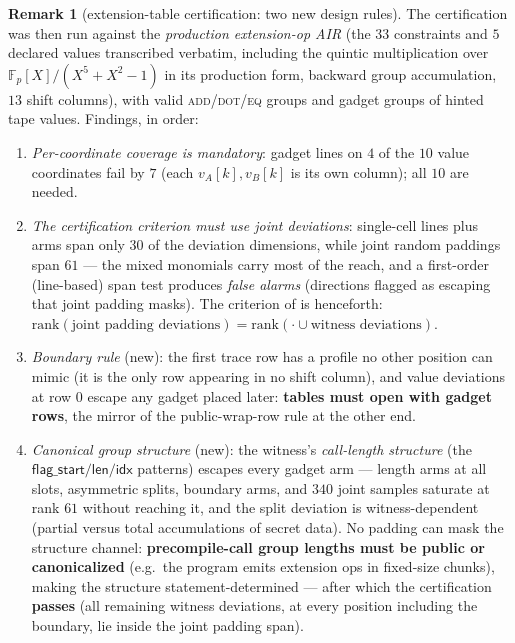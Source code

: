 \documentclass{article}
\newcommand{\Fp}{\mathbb{F}_p}
\theoremstyle{definition}
\newtheorem{remark}[theorem]{Remark}
\begin{document}
\begin{remark}[extension-table certification: two new design rules]\label{rem:numL}
The certification was then run against the \emph{production extension-op AIR} (the $33$ constraints and $5$ declared values transcribed verbatim, including the quintic multiplication over $\Fp[X]/(X^5{+}X^2{-}1)$ in its production form, backward group accumulation, $13$ shift columns), with valid \textsc{add}/\textsc{dot}/\textsc{eq} groups and gadget groups of hinted tape values. Findings, in order:
\begin{enumerate}
    \item \emph{Per-coordinate coverage is mandatory}: gadget lines on $4$ of the $10$ value coordinates fail by $7$ (each $v_A[k], v_B[k]$ is its own column); all $10$ are needed.
    \item \emph{The certification criterion must use joint deviations}: single-cell lines plus arms span only $30$ of the deviation dimensions, while joint random paddings span $61$ --- the mixed monomials carry most of the reach, and a first-order (line-based) span test produces \emph{false alarms} (directions flagged as escaping that joint padding masks). The criterion of  is henceforth: $\mathrm{rank}(\text{joint padding deviations}) = \mathrm{rank}(\cdot \cup \text{witness deviations})$.
    \item \emph{Boundary rule} (new): the first trace row has a profile no other position can mimic (it is the only row appearing in no shift column), and value deviations at row $0$ escape any gadget placed later: \textbf{tables must open with gadget rows}, the mirror of the public-wrap-row rule at the other end.
    \item \emph{Canonical group structure} (new): the witness's \emph{call-length structure} (the $\textsf{flag\_start}/\textsf{len}/\textsf{idx}$ patterns) escapes every gadget arm --- length arms at all slots, asymmetric splits, boundary arms, and $340$ joint samples saturate at rank $61$ without reaching it, and the split deviation is witness-dependent (partial versus total accumulations of secret data). No padding can mask the structure channel: \textbf{precompile-call group lengths must be public or canonicalized} (e.g.\ the program emits extension ops in fixed-size chunks), making the structure statement-determined --- after which the certification \textbf{passes} (all remaining witness deviations, at every position including the boundary, lie inside the joint padding span).
\end{enumerate}
\end{remark}
\end{document}
